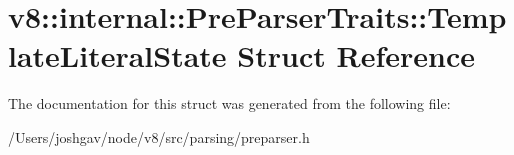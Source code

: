 \hypertarget{structv8_1_1internal_1_1_pre_parser_traits_1_1_template_literal_state}{}\section{v8\+:\+:internal\+:\+:Pre\+Parser\+Traits\+:\+:Template\+Literal\+State Struct Reference}
\label{structv8_1_1internal_1_1_pre_parser_traits_1_1_template_literal_state}


The documentation for this struct was generated from the following file\+:\begin{DoxyCompactItemize}
\item 
/\+Users/joshgav/node/v8/src/parsing/preparser.\+h\end{DoxyCompactItemize}
